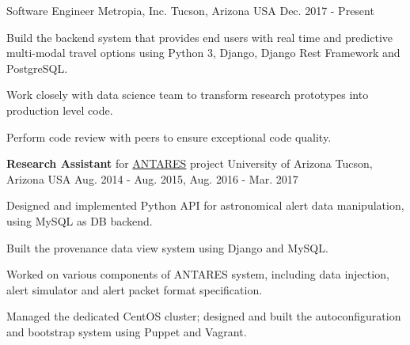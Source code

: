 

\begin{cventries}

  \cventry
    {Software Engineer} %
    {Metropia, Inc.} %
    {Tucson, Arizona USA} %
    {Dec. 2017 - Present} %
    {
      \begin{cvitems} %
       \item {Build the backend system that provides end users
    with real time and predictive multi-modal travel options using
    Python 3, Django, Django Rest Framework and PostgreSQL.}
       \item {Work closely with data science team to transform
    research prototypes into production level code.}
       \item {Perform code review with peers to ensure exceptional
    code quality.}
      \end{cvitems}
    }

  \cventry
    {\textbf{Research Assistant} for \href{https://www.noao.edu/ANTARES/}{ANTARES} project} %
    {University of Arizona} %
    {Tucson, Arizona USA} %
    {Aug. 2014 - Aug. 2015, Aug. 2016 - Mar. 2017} %
    {
      \begin{cvitems} %
      \item {Designed and implemented Python API for astronomical
    alert data manipulation, using MySQL as DB backend.}
      \item {Built the provenance data view system using Django and MySQL.}
      \item {Worked on various components of ANTARES system,
    including data injection, alert simulator and alert packet format specification.}
        \item {Managed the dedicated CentOS cluster; designed and
    built the autoconfiguration and bootstrap 
    system using Puppet and Vagrant.}
      \end{cvitems}
    }


\end{cventries}
